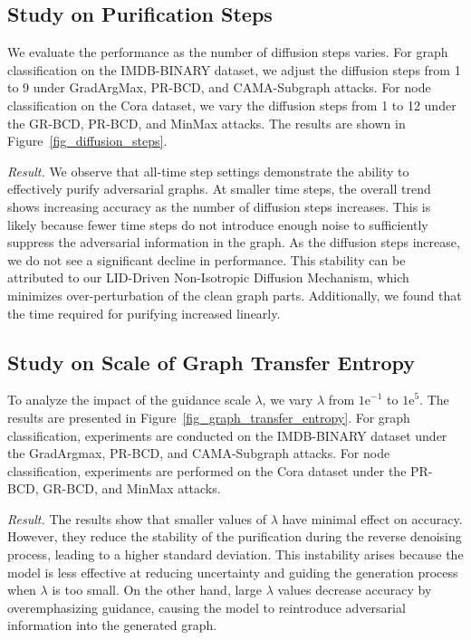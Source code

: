 


\subsection{Study on Purification Steps}
We evaluate the performance as the number of diffusion steps varies. For graph classification on the IMDB-BINARY dataset, we adjust the diffusion steps from 1 to 9 under GradArgMax, PR-BCD, and CAMA-Subgraph attacks. For node classification on the Cora dataset, we vary the diffusion steps from 1 to 12 under the GR-BCD, PR-BCD, and MinMax attacks.
The results are shown in Figure~\ref{fig_diffusion_steps}.


\textit{Result.}
We observe that all-time step settings demonstrate the ability to effectively purify adversarial graphs. At smaller time steps, the overall trend shows increasing accuracy as the number of diffusion steps increases. This is likely because fewer time steps do not introduce enough noise to sufficiently suppress the adversarial information in the graph. As the diffusion steps increase, we do not see a significant decline in performance. This stability can be attributed to our LID-Driven Non-Isotropic Diffusion Mechanism, which minimizes over-perturbation of the clean graph parts. Additionally, we found that the time required for purifying increased linearly.




\subsection{Study on Scale of Graph Transfer Entropy}
To analyze the impact of the guidance scale $\lambda$, we vary $\lambda$ from $\text{1e}^{-1}$ to $\text{1e}^{5}$. The results are presented in Figure~\ref{fig_graph_transfer_entropy}. For graph classification, experiments are conducted on the IMDB-BINARY dataset under the GradArgmax, PR-BCD, and CAMA-Subgraph attacks. For node classification, experiments are performed on the Cora dataset under the PR-BCD, GR-BCD, and MinMax attacks.

\textit{Result.} The results show that smaller values of $\lambda$ have minimal effect on accuracy. However, they reduce the stability of the purification during the reverse denoising process, leading to a higher standard deviation. This instability arises because the model is less effective at reducing uncertainty and guiding the generation process when $\lambda$ is too small.  On the other hand, large $\lambda$ values decrease accuracy by overemphasizing guidance, causing the model to reintroduce adversarial information into the generated graph.



